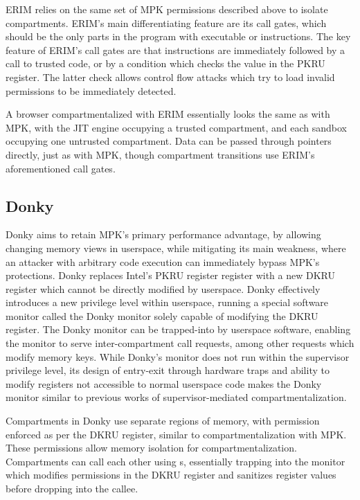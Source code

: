 ERIM relies on the same set of MPK permissions described above to
isolate compartments.
ERIM's main differentiating feature are its call gates, which should
be the only parts in the program with executable  or
 instructions.
The key feature of ERIM's call gates are that  instructions
are immediately followed by a call to trusted code, or by a condition which
checks the value in the PKRU register. 
The latter check allows control flow attacks which try to load invalid
permissions to be immediately detected.

A browser compartmentalized with ERIM essentially looks the same as with
MPK, with the JIT engine occupying a trusted compartment, and each sandbox
occupying one untrusted compartment. 
Data can be passed through pointers directly, just as with MPK, though 
compartment transitions use ERIM's aforementioned call gates.

\subsection{Donky}
Donky aims to retain MPK's primary performance advantage, by allowing
changing memory views in userspace, while mitigating its main weakness, 
where an attacker with arbitrary code execution can immediately bypass
MPK's protections.
Donky replaces Intel's PKRU register register with a new DKRU register
which cannot be directly modified by userspace.
Donky effectively introduces a new privilege level within userspace, 
running a special software monitor called the Donky monitor solely 
capable of modifying the DKRU register.
The Donky monitor can be trapped-into by userspace software, enabling the
monitor to serve inter-compartment call requests, among other requests
which modify memory keys.
While Donky's monitor does not run within the supervisor privilege level,
its design of entry-exit through hardware traps and ability to modify
registers not accessible to normal userspace code makes the Donky monitor
similar to previous works of supervisor-mediated compartmentalization.

Compartments in Donky use separate regions of memory, with permission
enforced as per the DKRU register, similar to compartmentalization with
MPK.
These permissions allow memory isolation for compartmentalization.
Compartments can call each other using s, essentially trapping
into the monitor which modifies permissions in the DKRU register and
sanitizes register values before dropping into the callee.

